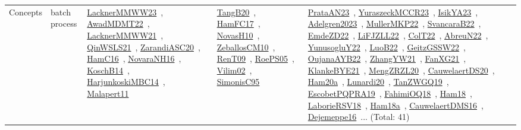 {\begin{longtable}{lp{3cm}>{\raggedright\arraybackslash}p{6cm}>{\raggedright\arraybackslash}p{6cm}>{\raggedright\arraybackslash}p{8cm}}
Concepts & batch process & \href{../works/LacknerMMWW23.pdf}{LacknerMMWW23}~\cite{LacknerMMWW23}, \href{../works/AwadMDMT22.pdf}{AwadMDMT22}~\cite{AwadMDMT22}, \href{../works/LacknerMMWW21.pdf}{LacknerMMWW21}~\cite{LacknerMMWW21}, \href{../works/QinWSLS21.pdf}{QinWSLS21}~\cite{QinWSLS21}, \href{../works/ZarandiASC20.pdf}{ZarandiASC20}~\cite{ZarandiASC20}, \href{../works/HamC16.pdf}{HamC16}~\cite{HamC16}, \href{../works/NovaraNH16.pdf}{NovaraNH16}~\cite{NovaraNH16}, \href{../works/KoschB14.pdf}{KoschB14}~\cite{KoschB14}, \href{../works/HarjunkoskiMBC14.pdf}{HarjunkoskiMBC14}~\cite{HarjunkoskiMBC14}, \href{../works/Malapert11.pdf}{Malapert11}~\cite{Malapert11} & \href{../works/TangB20.pdf}{TangB20}~\cite{TangB20}, \href{../works/HamFC17.pdf}{HamFC17}~\cite{HamFC17}, \href{../works/NovasH10.pdf}{NovasH10}~\cite{NovasH10}, \href{../works/ZeballosCM10.pdf}{ZeballosCM10}~\cite{ZeballosCM10}, \href{../works/RenT09.pdf}{RenT09}~\cite{RenT09}, \href{../works/RoePS05.pdf}{RoePS05}~\cite{RoePS05}, \href{../works/Vilim02.pdf}{Vilim02}~\cite{Vilim02}, \href{../works/SimonisC95.pdf}{SimonisC95}~\cite{SimonisC95} & \href{../works/PrataAN23.pdf}{PrataAN23}~\cite{PrataAN23}, \href{../works/YuraszeckMCCR23.pdf}{YuraszeckMCCR23}~\cite{YuraszeckMCCR23}, \href{../works/IsikYA23.pdf}{IsikYA23}~\cite{IsikYA23}, \href{../works/Adelgren2023.pdf}{Adelgren2023}~\cite{Adelgren2023}, \href{../works/MullerMKP22.pdf}{MullerMKP22}~\cite{MullerMKP22}, \href{../works/SvancaraB22.pdf}{SvancaraB22}~\cite{SvancaraB22}, \href{../works/EmdeZD22.pdf}{EmdeZD22}~\cite{EmdeZD22}, \href{../works/LiFJZLL22.pdf}{LiFJZLL22}~\cite{LiFJZLL22}, \href{../works/ColT22.pdf}{ColT22}~\cite{ColT22}, \href{../works/AbreuN22.pdf}{AbreuN22}~\cite{AbreuN22}, \href{../works/YunusogluY22.pdf}{YunusogluY22}~\cite{YunusogluY22}, \href{../works/LuoB22.pdf}{LuoB22}~\cite{LuoB22}, \href{../works/GeitzGSSW22.pdf}{GeitzGSSW22}~\cite{GeitzGSSW22}, \href{../works/OujanaAYB22.pdf}{OujanaAYB22}~\cite{OujanaAYB22}, \href{../works/ZhangYW21.pdf}{ZhangYW21}~\cite{ZhangYW21}, \href{../works/FanXG21.pdf}{FanXG21}~\cite{FanXG21}, \href{../works/KlankeBYE21.pdf}{KlankeBYE21}~\cite{KlankeBYE21}, \href{../works/MengZRZL20.pdf}{MengZRZL20}~\cite{MengZRZL20}, \href{../works/CauwelaertDS20.pdf}{CauwelaertDS20}~\cite{CauwelaertDS20}, \href{../works/Ham20a.pdf}{Ham20a}~\cite{Ham20a}, \href{../works/Lunardi20.pdf}{Lunardi20}~\cite{Lunardi20}, \href{../works/TanZWGQ19.pdf}{TanZWGQ19}~\cite{TanZWGQ19}, \href{../works/EscobetPQPRA19.pdf}{EscobetPQPRA19}~\cite{EscobetPQPRA19}, \href{../works/FahimiOQ18.pdf}{FahimiOQ18}~\cite{FahimiOQ18}, \href{../works/Ham18.pdf}{Ham18}~\cite{Ham18}, \href{../works/LaborieRSV18.pdf}{LaborieRSV18}~\cite{LaborieRSV18}, \href{../works/Ham18a.pdf}{Ham18a}~\cite{Ham18a}, \href{../works/CauwelaertDMS16.pdf}{CauwelaertDMS16}~\cite{CauwelaertDMS16}, \href{../works/Dejemeppe16.pdf}{Dejemeppe16}~\cite{Dejemeppe16}... (Total: 41)\\

\end{longtable}}
